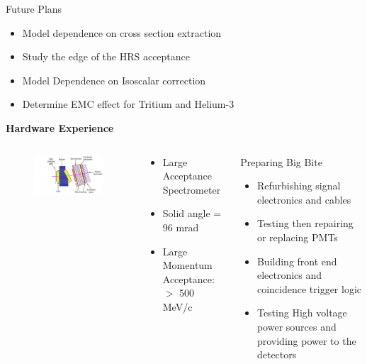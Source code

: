 \documentclass[12pt]{beamer}
\begin{document}
\begin{frame}{}
\begin{block}{Future Plans}
	\begin{itemize}
		\item Model dependence on cross section extraction
		\item Study the edge of the HRS acceptance 
		\item Model Dependence on Isoscalar correction
		\item Determine EMC effect for Tritium and Helium-3
	\end{itemize}
\end{block}
\end{frame}

\begin{frame}
\centering 
\textbf{Hardware Experience}
\begin{columns}
	
	\begin{figure}
		\hspace*{-1.4cm}	\includegraphics[width=7cm]{../images/Thesis/BigBite1.png}
	\end{figure}
	\begin{block}{}
		\begin{itemize}
			\item[] Large Acceptance Spectrometer
			\item Solid angle = 96 mrad
			\item Large Momentum Acceptance: $>$ 500 MeV/c
		\end{itemize}
	\end{block}
	
	\hspace*{0.5cm}
	\begin{block}{Preparing Big Bite}
		\begin{itemize}
			\item Refurbishing signal electronics and cables
			\item Testing then repairing or replacing PMTs
			\item Building front end electronics and coincidence trigger logic
			\item Testing High voltage power sources and providing power to the detectors
		\end{itemize}
	\end{block}
\end{columns}
\end{frame}
\end{document}
